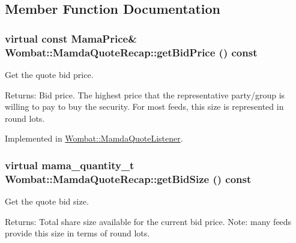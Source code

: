 \subsection{Member Function Documentation}
\hypertarget{classWombat_1_1MamdaQuoteRecap_3ce7b05559823ceb1fa18a2f570164e3}{
\subsubsection[getBidPrice]{\setlength{\rightskip}{0pt plus 5cm}virtual const Mama\-Price\& Wombat::Mamda\-Quote\-Recap::get\-Bid\-Price () const}}
\label{classWombat_1_1MamdaQuoteRecap_3ce7b05559823ceb1fa18a2f570164e3}


Get the quote bid price. 

\begin{Desc}
\item[Returns:]Bid price. The highest price that the representative party/group is willing to pay to buy the security. For most feeds, this size is represented in round lots. \end{Desc}


Implemented in \hyperlink{classWombat_1_1MamdaQuoteListener_af4b7f010c56303476dc4de64fa0b3f4}{Wombat::Mamda\-Quote\-Listener}.\hypertarget{classWombat_1_1MamdaQuoteRecap_17c7f7da47862ebc9be5c1f51af674e0}{
\subsubsection[getBidSize]{\setlength{\rightskip}{0pt plus 5cm}virtual mama\_\-quantity\_\-t Wombat::Mamda\-Quote\-Recap::get\-Bid\-Size () const}}
\label{classWombat_1_1MamdaQuoteRecap_17c7f7da47862ebc9be5c1f51af674e0}


Get the quote bid size. 

\begin{Desc}
\item[Returns:]Total share size available for the current bid price. Note: many feeds provide this size in terms of round lots. \end{Desc}


